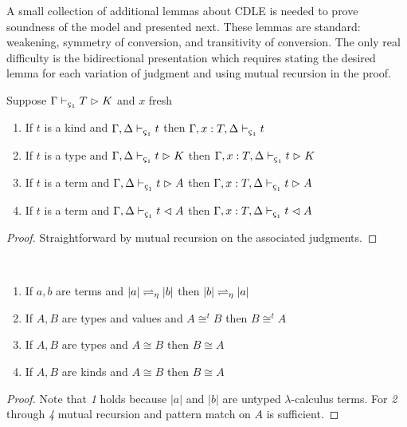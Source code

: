 A small collection of additional lemmas about CDLE is needed to prove soundness of the model and presented next.
These lemmas are standard: weakening, symmetry of conversion, and transitivity of conversion.
The only real difficulty is the bidirectional presentation which requires stating the desired lemma for each variation of judgment and using mutual recursion in the proof.

\begin{lemma}
    \label{lem:4:c1_weakening}
    Suppose $\Gamma \vdash_{\oldced} T \infr K$ and $x$ fresh
    \begin{enumerate}
        \item If $t$ is a kind and $\Gamma, \Delta \vdash_{\oldced} t$ then $\Gamma, x : T, \Delta \vdash_{\oldced} t$
        \item If $t$ is a type and $\Gamma, \Delta \vdash_{\oldced} t \infr K$ then $\Gamma, x : T, \Delta \vdash_{\oldced} t \infr K$
        \item If $t$ is a term and $\Gamma, \Delta \vdash_{\oldced} t \infr A$ then $\Gamma, x : T, \Delta \vdash_{\oldced} t \infr A$
        \item If $t$ is a term and $\Gamma, \Delta \vdash_{\oldced} t \chck A$ then $\Gamma, x : T, \Delta \vdash_{\oldced} t \chck A$
    \end{enumerate}
\end{lemma}
\begin{proof}
    Straightforward by mutual recursion on the associated judgments.
\end{proof}

\begin{lemma}
    \label{lem:4:c1_sym}
    \textcolor{white}{\_}
    \begin{enumerate}
        \item If $a, b$ are terms and $|a| \rightleftharpoons_\eta |b|$ then $|b| \rightleftharpoons_\eta |a|$
        \item If $A, B$ are types and values and $A \cong^t B$ then $B \cong^t A$
        \item If $A, B$ are types and $A \cong B$ then $B \cong A$
        \item If $A, B$ are kinds and $A \cong B$ then $B \cong A$
    \end{enumerate}
\end{lemma}
\begin{proof}
    Note that \textit{1} holds because $|a|$ and $|b|$ are untyped $\lambda$-calculus terms.
    For \textit{2} through \textit{4} mutual recursion and pattern match on $A$ is sufficient.
\end{proof}

